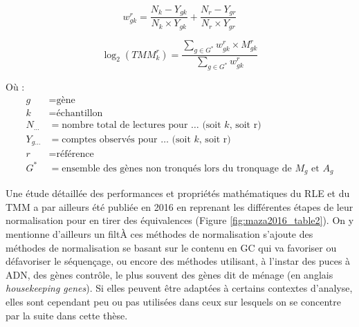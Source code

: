 \begin{equation}\label{weightedmean}
    w^r_{gk} = \frac{N_k - Y_{gk}}{N_k \times Y_{gk}} + \frac{N_r - Y_{gr}}{N_r \times Y_{gr}}
\end{equation}

\begin{equation}\label{normtmmfactor}
    \log_2{} (TMM^r_k) = \frac{\sum_{g \in G^*} w^r_{gk} \times M^r_{gk}}{\sum_{g \in G^*} w^r_{gk}}
\end{equation}

Où :
\begin{align*}
    g & = \text{gène} \\
    k & = \text{échantillon} \\
    N_{…} & = \text{nombre total de lectures pour … (soit }k \text{, soit r)} \\
    Y_{g…} & = \text{comptes observés pour … (soit }k \text{, soit r)} \\
    r & = \text{référence} \\
    G^* & = \text{ensemble des gènes non tronqués lors du tronquage de } M_g \text{ et } A_g
\end{align*}



Une étude détaillée des performances et propriétés mathématiques du RLE et du TMM a par ailleurs été publiée en 2016 en reprenant les différentes étapes de leur normalisation pour en tirer des équivalences \cite{Maza2016} (Figure \ref{fig:maza2016_table2}). On y mentionne d'ailleurs un filtÀ ces méthodes de normalisation s'ajoute des méthodes de normalisation se basant sur le contenu en GC qui va favoriser ou défavoriser le séquençage, ou encore des méthodes utilisant, à l'instar des puces à ADN, des gènes contrôle, le plus souvent des gènes dit de ménage (en anglais \textit{housekeeping genes}). Si elles peuvent être adaptées à certains contextes d'analyse, elles sont cependant peu ou pas utilisées dans ceux sur lesquels on se concentre par la suite dans cette thèse. 


